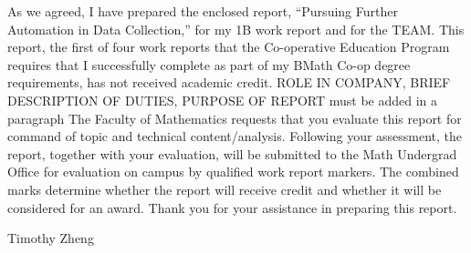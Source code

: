 \documentclass[12pt]{article}
\newcommand{\term}{1B } %
\newcommand{\WTT}{Pursuing Further Automation in Data Collection}
\begin{document}




\FirstPage

\newpage




\LetterHead



As we agreed, I have prepared the enclosed report, “\WTT,” for
my \term work report and for the TEAM. This
report, the first of four work reports that the Co-operative Education Program
requires that I successfully complete as part of my BMath Co-op degree
requirements, has not received academic credit.
\vskip 10pt
ROLE IN COMPANY, BRIEF DESCRIPTION OF DUTIES, PURPOSE OF REPORT must be added in a paragraph
\vskip 10pt 
The Faculty of Mathematics requests that you evaluate this report for command
of topic and technical content/analysis. Following your assessment, the report,
together with your evaluation, will be submitted to the Math Undergrad Office
for evaluation on campus by qualified work report markers. The combined
marks determine whether the report will receive credit and whether it will be
considered for an award.
\vskip 10pt 
Thank you for your assistance in preparing this report.

Timothy Zheng






\toc 






\end{document}
